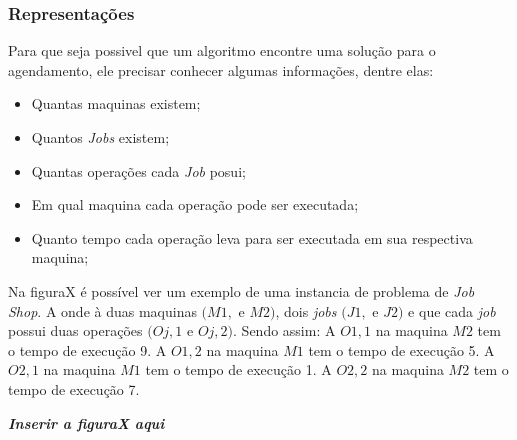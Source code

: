         \subsubsection{Representações}
            Para que seja possivel que um algoritmo encontre uma solução para o agendamento, ele precisar conhecer algumas informações, dentre elas: 
            \begin{itemize}
                \item Quantas maquinas existem;
                \item Quantos \textit{Jobs} existem;
                \item Quantas operações cada \textit{Job} posui;
                \item Em qual maquina cada operação pode ser executada;
                \item Quanto tempo cada operação leva para ser executada em sua respectiva maquina;
            \end{itemize}


            Na figuraX é possível ver um exemplo de uma instancia de problema de \textit{Job Shop}. A onde à duas maquinas $(M1, $ e $M2)$, dois \textit{jobs} $(J1, $ e $J2)$ e que cada \textit{job} possui duas operações $(Oj,1 $ e $Oj,2)$.\newline
            Sendo assim:\newline
            A $O1,1$ na maquina $M2$ tem o tempo de execução 9.\newline 
            A $O1,2$ na maquina $M1$ tem o tempo de execução 5.\newline
            A $O2,1$ na maquina $M1$ tem o tempo de execução 1. \newline
            A $O2,2$ na maquina $M2$ tem o tempo de execução 7. \newline

            \textit{\textbf{Inserir a figuraX aqui}}\newline



